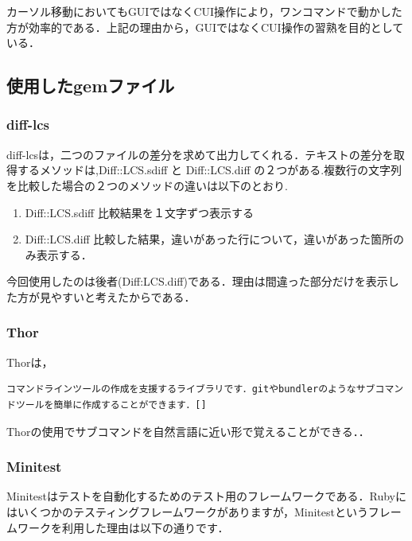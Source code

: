 \documentclass[11pt,dvipdfmx]{jsarticle}
\providecommand{\tightlist}{%
      \setlength{\itemsep}{0pt}\setlength{\parskip}{0pt}}
\begin{document}
カーソル移動においてもGUIではなくCUI操作により，ワンコマンドで動かした方が効率的である．上記の理由から，GUIではなくCUI操作の習熟を目的としている．

    \subsection{使用したgemファイル}\label{ux4f7fux7528ux3057ux305fgemux30d5ux30a1ux30a4ux30eb}

    \subsubsection{diff-lcs}\label{diff-lcs}

    diff-lcsは，二つのファイルの差分を求めて出力してくれる．テキストの差分を取得するメソッドは,Diff::LCS.sdiff
と Diff::LCS.diff
の２つがある.複数行の文字列を比較した場合の２つのメソッドの違いは以下のとおり.

\begin{enumerate}
\def\labelenumi{\arabic{enumi}.}
\tightlist
\item
  Diff::LCS.sdiff 比較結果を１文字ずつ表示する
\item
  Diff::LCS.diff
  比較した結果，違いがあった行について，違いがあった箇所のみ表示する．
\end{enumerate}

今回使用したのは後者(Diff:LCS.diff)である．理由は間違った部分だけを表示した方が見やすいと考えたからである．

    \subsubsection{Thor}\label{thor}

    Thorは，

\begin{verbatim}
コマンドラインツールの作成を支援するライブラリです．gitやbundlerのようなサブコマンドツールを簡単に作成することができます．[]
\end{verbatim}

Thorの使用でサブコマンドを自然言語に近い形で覚えることができる．．

    \subsubsection{Minitest}\label{minitest}

    Minitestはテストを自動化するためのテスト用のフレームワークである．Rubyにはいくつかのテスティングフレームワークがありますが，Minitestというフレームワークを利用した理由は以下の通りです．
\end{document}
